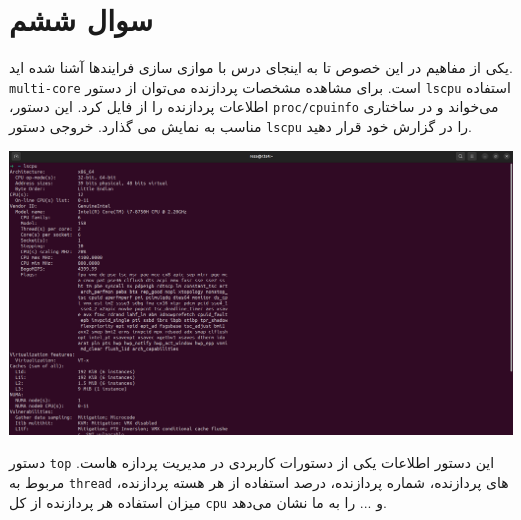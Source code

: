\section{سوال ششم}
‫تا به‬ ‫اینجای‬ ‫درس‬ ‫با‬ ‫موازی‬ ‫سازی‬ ‫فرایندها‬ ‫آشنا‬ ‫شده‬ ‫اید‬ ‫‪.‬‬‫یکی‬ ‫از‬ ‫مفاهیم‬ ‫در‬ ‫این‬ ‫خصوص‬ \texttt{multi-core} است. ‫برای مشاهده‬ ‫مشخصات‬ ‫پردازنده‬ ‫می‌توان‬ ‫از‬ ‫دستور‬ \texttt{lscpu} استفاده کرد. ‫این‬ ‫دستور‪،‬‬ ‫اطلاعات‬ ‫پردازنده‬ ‫را‬ ‫از‬ ‫فایل‬ \texttt{proc/cpuinfo} می‌خواند و ‫در‬ ‫ساختاری‬ ‫مناسب‬ ‫به‬ ‫نمایش‬ ‫می‬ ‫گذارد‬. خروجی دستور \texttt{lscpu} را در گزارش خود قرار دهید.
\begin{qsolve}
	\begin{center}
		\includegraphics[width=\textwidth]{pics/img1.png}
	\end{center}
\end{qsolve}

دستور \texttt{top} یکی از ‫دستورات‬ ‫کاربردی‬ ‫در‬ ‫مدیریت‬ ‫پردازه‬ ‫هاست‪.‬‬ ‫این‬ ‫دستور‬ ‫اطلاعات‬ ‫مربوط‬ ‫به‬ \texttt{thread} های پردازنده، شماره پردازنده، ‫درصد‬ ‫استفاده‬ ‫از‬ ‫هر‬ ‫هسته‬ ‫پردازنده‬، ‫میزان‬ ‫استفاده‬ ‫هر‬ ‫پردازنده‬ ‫از‬ ‫کل‬ \texttt{cpu} و ... را به ما نشان می‌دهد. \\ \\ \\

